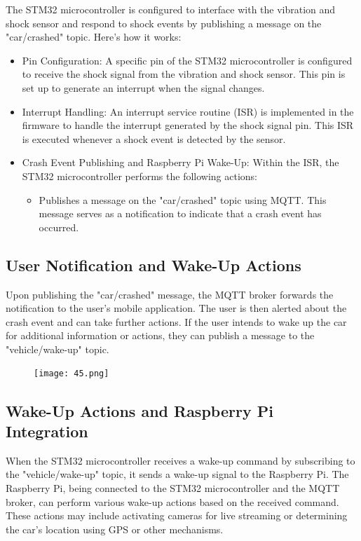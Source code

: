 \documentclass[
12pt,
oneside, 
onehalfspacing, 
nolistspacing, 
parskip, 
chapterinoneline, 
]{AASTCOMPUTER}
\begin{document}
The STM32 microcontroller is configured to interface with the vibration and shock sensor and respond to shock events by publishing a message on the "car/crashed" topic. Here's how it works:

\begin{itemize}
  \item Pin Configuration: A specific pin of the STM32 microcontroller is configured to receive the shock signal from the vibration and shock sensor. This pin is set up to generate an interrupt when the signal changes.
  \item Interrupt Handling: An interrupt service routine (ISR) is implemented in the firmware to handle the interrupt generated by the shock signal pin. This ISR is executed whenever a shock event is detected by the sensor.
  \item Crash Event Publishing and Raspberry Pi Wake-Up: Within the ISR, the STM32 microcontroller performs the following actions:
    \begin{itemize}
      \item Publishes a message on the "car/crashed" topic using MQTT. This message serves as a notification to indicate that a crash event has occurred.
    \end{itemize}
\end{itemize}

\subsection{User Notification and Wake-Up Actions}
Upon publishing the "car/crashed" message, the MQTT broker forwards the notification to the user's mobile application. The user is then alerted about the crash event and can take further actions. If the user intends to wake up the car for additional information or actions, they can publish a message to the "vehicle/wake-up" topic.

\begin{figure}[!ht]
\centering
\texttt{[image: 45.png]}
\caption[STM32 Guard]{}
\label{fig:TCU}
\end{figure} 

\subsection{Wake-Up Actions and Raspberry Pi Integration}
When the STM32 microcontroller receives a wake-up command by subscribing to the "vehicle/wake-up" topic, it sends a wake-up signal to the Raspberry Pi. The Raspberry Pi, being connected to the STM32 microcontroller and the MQTT broker, can perform various wake-up actions based on the received command. These actions may include activating cameras for live streaming or determining the car's location using GPS or other mechanisms.
\end{document}
